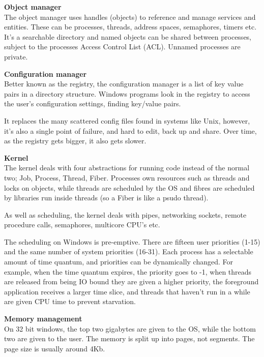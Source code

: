 \begin{description}
  \item \textbf{Object manager}\\
    The object manager uses handles (objects) to reference and manage services
    and entities. These can be processes, threads, address spaces, semaphores,
    timers etc. It's a searchable directory and named objects can be shared
    between processes, subject to the processes Access Control List (ACL).
    Unnamed processes are private.

  \item \textbf{Configuration manager}\\
    Better known as the registry, the configuration manager is a list of key
    value pairs in a  directory structure. Windows programs look in the registry
    to access the user's configuration settings, finding key/value pairs.

    It replaces the many scattered config files found in systems like Unix,
    however, it's also a single point of failure, and hard to edit, back up and
    share. Over time, as the registry gets bigger, it also gets slower.

  \item \textbf{Kernel}\\
    The kernel deals with four abstractions for running code instead of the
    normal two; Job, Process, Thread, Fiber. Processes own resources such as
    threads and locks on objects, while threads are scheduled by the OS and
    fibres are scheduled by libraries run inside threads (so a Fiber is like a
    psudo thread).

    As well as scheduling, the kernel deals with pipes, networking sockets,
    remote procedure calls, semaphores, multicore CPU's etc.

    The scheduling on Windows is pre-emptive. There are fifteen user priorities
    (1-15) and the same number of system priorities (16-31). Each process has a
    selectable amount of time quantum, and priorities can be dynamically
    changed. For example, when the time quantum expires, the priority goes to
    -1, when threads are released from being IO bound they are given a higher
    priority, the foreground application receives a larger time slice, and
    threads that haven't run in a while are given CPU time to prevent
    starvation.

  \item \textbf{Memory management}\\
    On 32 bit windows, the top two gigabytes are given to the OS, while the
    bottom two are given to the user. The memory is split up into pages, not
    segments. The page size is usually around 4Kb.


\end{description}
